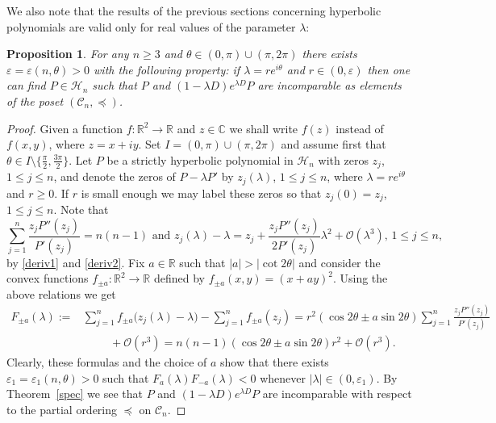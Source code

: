 \documentclass[10pt,twoside,a4paper,reqno]{amsart}
\theoremstyle{plain}
\newtheorem{prop+}           {Proposition}
\theoremstyle{definition}
\theoremstyle{remark}
\newenvironment{proposition}{\begin{prop+}}{\end{prop+}}
\newcommand {\bC} {\mathbb {C}}
\newcommand {\bR} {\mathbb {R}}
\newcommand {\la} {\lambda}
\newcommand {\te} {\theta}
\newcommand {\ve} {\varepsilon}
\newcommand {\calH} {\mathcal {H}}
\newcommand {\calC} {\mathcal {C}}
\newcommand {\calO} {\mathcal {O}}
\begin{document}
We also note that the results of the previous sections concerning
hyperbolic polynomials are valid only for real values of the parameter $\la$:

\begin{proposition}\label{counter2}
For any $n\ge 3$ and $\te\in (0,\pi)\cup (\pi,2\pi)$ there exists 
$\ve=\ve(n,\te)>0$ with the following property: 
if $\la=r e^{i\te}$ and $r\in (0,\ve)$ then one can find 
$P\in \calH_n$ such that $P$ and $(1-\la D)e^{\la D}P$ are 
incomparable as elements of the poset $(\calC_{n},\preccurlyeq)$.
\end{proposition}

\begin{proof}
Given a function $f:\bR^2\rightarrow \bR$ and $z\in \bC$ we shall write
$f(z)$ instead of $f(x,y)$, where $z=x+iy$. Set $I=(0,\pi)\cup (\pi,2\pi)$ 
and assume first 
that $\te\in I\setminus \{\frac{\pi}{2},\frac{3\pi}{2}\}$. Let $P$ 
be a strictly hyperbolic polynomial in $\calH_n$ with zeros $z_j$, 
$1\le j\le n$, and denote the zeros of $P-\la P'$ by $z_j(\la)$, 
$1\le j\le n$, where 
$\la=r e^{i\te}$ and $r\ge 0$. If $r$ is small enough we may label these 
zeros so that $z_j(0)=z_j$, $1\le j\le n$. Note that
$$\sum_{j=1}^{n}\frac{z_{j}P''(z_j)}{P'(z_j)}=n(n-1)\text{ and }z_j(\la)-\la=
z_j+\frac{z_{j}P''(z_j)}{2P'(z_j)}\la^2+\calO(\la^3),\,1\le j\le n,$$
by \eqref{deriv1} and \eqref{deriv2}. Fix $a\in \bR$ such that 
$|a|>|\cot 2\te|$ and consider the convex functions 
$f_{\pm a}:\bR^2\rightarrow \bR$ defined by $f_{\pm a}(x,y)=(x+ay)^2$. 
Using the above relations we get
\begin{equation*}
\begin{split}
F_{\pm a}(\la):= & \sum_{j=1}^{n}f_{\pm a}\big(z_j(\la)-\la\big)-
\sum_{j=1}^{n}f_{\pm a}(z_j)
=r^2(\cos 2\te\pm a\sin 2\te)
\sum_{j=1}^{n}\frac{z_{j}P''(z_j)}{P'(z_j)}\\
& \phantom{space}+\calO(r^3)=n(n-1)(\cos 2\te\pm a\sin 2\te)r^2+\calO(r^3).
\end{split}
\end{equation*}
Clearly, these formulas and the choice of $a$ show that there exists 
$\ve_1=\ve_1(n,\te)>0$ such that $F_{a}(\la)F_{-a}(\la)<0$ 
whenever $|\la|\in (0,\ve_1)$. By Theorem~\ref{spec} we see that
$P$ and $(1-\la D)e^{\la D}P$ are 
incomparable with respect to the partial ordering $\preccurlyeq$ on 
$\calC_{n}$.


\end{proof}
\end{document}
